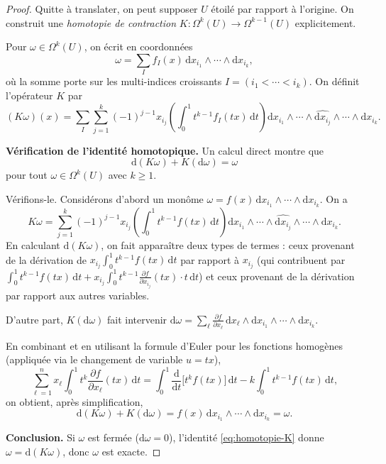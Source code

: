 \documentclass[12pt,a4paper,openany]{book}
\theoremstyle{definition}
\theoremstyle{plain}
\theoremstyle{remark}
\newcommand{\dd}{\mathrm{d}}
\begin{document}
\begin{proof}
Quitte à translater, on peut supposer $U$ étoilé par rapport à l'origine.
On construit une \emph{homotopie de contraction}
$K \colon \Omega^k(U) \to \Omega^{k-1}(U)$ explicitement.

Pour $\omega \in \Omega^k(U)$, on écrit en coordonnées
\[
  \omega = \sum_{I} f_I(x) \, \dd x_{i_1} \wedge \cdots \wedge \dd x_{i_k},
\]
où la somme porte sur les multi-indices croissants $I = (i_1 < \cdots < i_k)$.
On définit l'opérateur $K$ par
\[
  (K\omega)(x)
  = \sum_{I} \sum_{j=1}^{k} (-1)^{j-1} x_{i_j}
    \left(\int_0^1 t^{k-1} f_I(tx) \, \dd t\right)
    \dd x_{i_1} \wedge \cdots \wedge \widehat{\dd x_{i_j}}
    \wedge \cdots \wedge \dd x_{i_k}.
\]

\noindent\textbf{Vérification de l'identité homotopique.}
Un calcul direct montre que
\begin{equation}\label{eq:homotopie-K}
  \dd(K\omega) + K(\dd\omega) = \omega
\end{equation}
pour tout $\omega \in \Omega^k(U)$ avec $k \geq 1$.

Vérifions-le. Considérons d'abord un monôme $\omega = f(x)\,\dd x_{i_1}
\wedge \cdots \wedge \dd x_{i_k}$. On a
\[
  K\omega = \sum_{j=1}^k (-1)^{j-1} x_{i_j}
  \left(\int_0^1 t^{k-1} f(tx)\,\dd t\right)
  \dd x_{i_1} \wedge \cdots \wedge \widehat{\dd x_{i_j}} \wedge \cdots
  \wedge \dd x_{i_k}.
\]
En calculant $\dd(K\omega)$, on fait apparaître deux types de termes :
ceux provenant de la dérivation de $x_{i_j} \int_0^1 t^{k-1}f(tx)\,\dd t$
par rapport à $x_{i_j}$ (qui contribuent par $\int_0^1 t^{k-1}f(tx)\,\dd t
+ x_{i_j}\int_0^1 t^{k-1}\frac{\partial f}{\partial x_{i_j}}(tx) \cdot t\,\dd t$)
et ceux provenant de la dérivation par rapport aux autres variables.

D'autre part, $K(\dd\omega)$ fait intervenir
$\dd\omega = \sum_\ell \frac{\partial f}{\partial x_\ell}\,\dd x_\ell
\wedge \dd x_{i_1} \wedge \cdots \wedge \dd x_{i_k}$.

En combinant et en utilisant la formule d'Euler pour les fonctions homogènes
(appliquée via le changement de variable $u = tx$),
\[
  \sum_{\ell=1}^n x_\ell \int_0^1 t^k \frac{\partial f}{\partial x_\ell}(tx)
  \,\dd t = \int_0^1 \frac{\dd}{\dd t}\bigl[t^k f(tx)\bigr]\,\dd t
  - k\int_0^1 t^{k-1}f(tx)\,\dd t,
\]
on obtient, après simplification,
\[
  \dd(K\omega) + K(\dd\omega) = f(x)\,\dd x_{i_1}\wedge\cdots\wedge\dd x_{i_k}
  = \omega.
\]

\noindent\textbf{Conclusion.}
Si $\omega$ est fermée ($\dd\omega = 0$), l'identité \eqref{eq:homotopie-K}
donne $\omega = \dd(K\omega)$, donc $\omega$ est exacte.
\end{proof}
\end{document}

